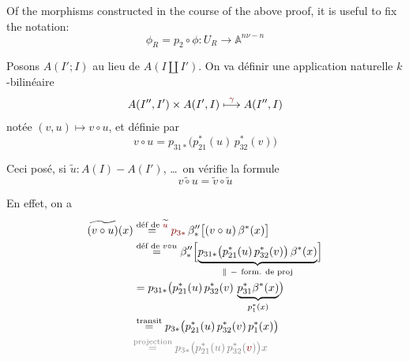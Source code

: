 Of the morphisms constructed in the course of the above proof, it is useful to  fix the notation:
\[
\phi_R=p_2\circ\phi:U_R\longrightarrow\mathbb{A}^{n\nu-n}
\]


Posons $A(I';I)$ au lieu de $A(I\amalg I')$.
On va définir une application naturelle $k$-bilinéaire
\[
A(I'',I')\times A(I',I)\overset{\unsure{\gamma}}{\longmapsto}A(I'',I)
\]
notée $(v,u)\longmapsto v\circ u$, et définie par
\[
v\circ u=p_{31*}\bigl(p_{21}^*(u)\,p_{32}^*(v)\bigr)
\]

Ceci posé, si $\widetilde{u}:A(I)-A(I')$, \ldots\ on vérifie la formule
\[
\widetilde{v\circ u}=\widetilde v\circ\widetilde u
\]

En effet, on a
\[
\begin{aligned}
\widetilde{(v\circ u)}(x)
&\overset{\text{déf de }\widetilde{\deleted{\unsure{u}}}}{=}
\deleted{\unsure{p_{3*}}}\,
\beta''_*\bigl[(v\circ u)\,\beta^*(x)\bigr]\\
&\overset{\text{déf de }v\circ u}{=}
\beta''_*\Bigl[\underbrace{p_{31*}\bigl(p_{21}^*(u)\,p_{32}^*(v)\bigr)\,\beta^*(x)}
_{\Vert\ -\ \text{form. de proj}}\Bigr]\\
&=p_{31*}\bigl(p_{21}^*(u)\,p_{32}^*(v)\,
\underbrace{p_{31}^*\beta^*(x)}_{p_1^*(x)}\bigr)\\
&\overset{\text{transit}}{=}p_{3*}\bigl(p_{21}^*(u)\,p_{32}^*(v)\,p_1^*(x)\bigr)\\
&\deleted{\overset{\text{projection}}{=}p_{3*}\bigl(p_{21}^*(u)\,p_{32}^*(\unsure{v})\bigr)x}
\end{aligned}
\]

